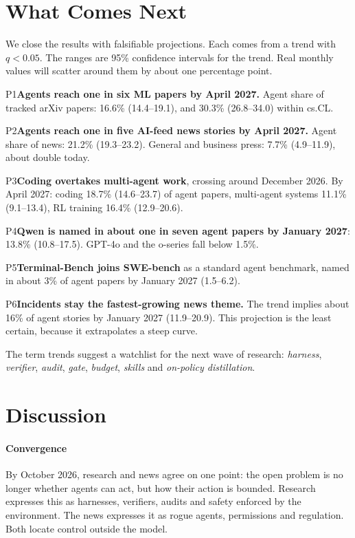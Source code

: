 \documentclass[10.5pt]{article}
\newcommand{\pred}[2]{\begin{tcolorbox}[enhanced, colback=white, colframe=lavline, boxrule=0.6pt, arc=4pt, left=8pt, right=8pt, top=5pt, bottom=5pt, fontupper=\small]{\sorasemi\color{qpurple}#1}\quad #2\end{tcolorbox}}
\begin{document}
\section{What Comes Next}

We close the results with falsifiable projections. Each comes from a trend with $q<0.05$. The ranges are 95\% confidence intervals for the trend. Real monthly values will scatter around them by about one percentage point.

\pred{P1}{\textbf{Agents reach one in six ML papers by April 2027.} Agent share of tracked arXiv papers: 16.6\% (14.4--19.1), and 30.3\% (26.8--34.0) within cs.CL.}
\pred{P2}{\textbf{Agents reach one in five AI-feed news stories by April 2027.} Agent share of news: 21.2\% (19.3--23.2). General and business press: 7.7\% (4.9--11.9), about double today.}
\pred{P3}{\textbf{Coding overtakes multi-agent work}, crossing around December 2026. By April 2027: coding 18.7\% (14.6--23.7) of agent papers, multi-agent systems 11.1\% (9.1--13.4), RL training 16.4\% (12.9--20.6).}
\pred{P4}{\textbf{Qwen is named in about one in seven agent papers by January 2027}: 13.8\% (10.8--17.5). GPT-4o and the o-series fall below 1.5\%.}
\pred{P5}{\textbf{Terminal-Bench joins SWE-bench} as a standard agent benchmark, named in about 3\% of agent papers by January 2027 (1.5--6.2).}
\pred{P6}{\textbf{Incidents stay the fastest-growing news theme.} The trend implies about 16\% of agent stories by January 2027 (11.9--20.9). This projection is the least certain, because it extrapolates a steep curve.}

The term trends suggest a watchlist for the next wave of research: \emph{harness}, \emph{verifier}, \emph{audit}, \emph{gate}, \emph{budget}, \emph{skills} and \emph{on-policy distillation}.

\section{Discussion}

\paragraph{Convergence} By October 2026, research and news agree on one point: the open problem is no longer whether agents can act, but how their action is bounded. Research expresses this as harnesses, verifiers, audits and safety enforced by the environment. The news expresses it as rogue agents, permissions and regulation. Both locate control outside the model.
\end{document}
